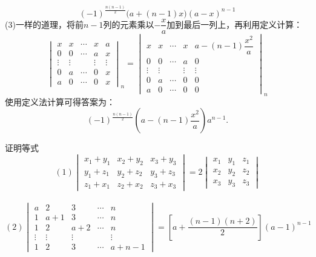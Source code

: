 \begin{solution}
\[(-1)^{\frac{n(n-1)}{2}}\bigg(a+(n-1)x\bigg)(a-x)^{n-1}\]
(3)一样的道理，将前$n-1$列的元素乘以$-\dfrac{x}{a}$加到最后一列上，再利用定义计算：\\\vspace{-5pt}\[
\begin{vmatrix}x&x&\cdots&x&a\\0&0&\cdots&a&x\\\vdots&\vdots&&\vdots&\vdots\\0&a&\cdots&0&x\\a&0&\cdots&0&x\end{vmatrix}_n=
\begin{vmatrix}x&x&\cdots&x&a-(n-1)\dfrac{x^2}{a}\\0&0&\cdots&a&0\\\vdots&\vdots&&\vdots&\vdots\\0&a&\cdots&0&0\\a&0&\cdots&0&0\end{vmatrix}_n\]
使用定义法计算可得答案为：\[(-1)^{\frac{n(n-1)}{2}}(a-(n-1)\dfrac{x^2}{a})a^{n-1}.\]
\end{solution}
\begin{example}{证明等式}{}
    \vspace{-5pt}\[(1)\begin{vmatrix}x_1+y_1&x_2+y_2&x_3+y_3\\y_1+z_1&y_2+z_2&y_3+z_3\\z_1+x_1&z_2+x_2&z_3+x_3\end{vmatrix}=2\begin{vmatrix}x_1&y_1&z_1\\x_2&y_2&z_2\\x_3&y_3&z_3\end{vmatrix}\]\\\vspace{-15pt}
    \[(2)\begin{vmatrix}a&2&3&\cdots&n\\1&a+1&3&\cdots&n\\1&2&a+2&\cdots&n\\\vdots&\vdots&\vdots&&\vdots\\1&2&3&\cdots&a+n-1\end{vmatrix}=\left[a+\frac{(n-1)(n+2)}{2}\right](a-1)^{n-1}\]
\end{example}
